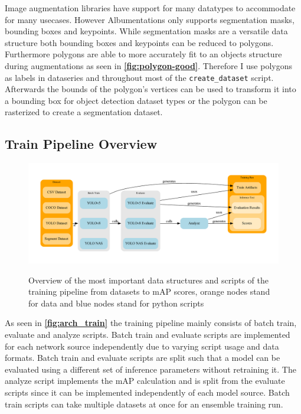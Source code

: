 \documentclass[10pt]{book}
\newcommand{\figureref}[1]{\textbf{\autoref{#1}}}
\begin{document}
Image augmentation libraries have support for many datatypes to accommodate for many usecases. However Albumentations only supports segmentation masks, bounding boxes and keypoints. While segmentation masks are a versatile data structure both bounding boxes and keypoints can be reduced to polygons. Furthermore polygons are able to more accurately fit to an objects structure during augmentations as seen in \figureref{fig:polygon-good}. Therefore I use polygons as labels in dataseries and throughout most of the \texttt{create\_dataset} script. Afterwards the bounds of the polygon's vertices can be used to transform it into a bounding box for object detection dataset types or the polygon can be rasterized to create a segmentation dataset.

\subsection{Train Pipeline Overview}

\begin{figure}
  \caption{Overview of the most important data structures and scripts of the training pipeline from datasets to \ac{mAP} scores, orange nodes stand for data and blue nodes stand for python scripts}
  \includegraphics[width=\textwidth]{graph/arch_train}
  \label{fig:arch_train}
\end{figure}

As seen in \figureref{fig:arch_train} the training pipeline mainly consists of batch train, evaluate and analyze scripts. Batch train and evaluate scripts are implemented for each network source independently due to varying script usage and data formats. Batch train and evaluate scripts are split such that a model can be evaluated using a different set of inference parameters without retraining it. The analyze script implements the \ac{mAP} calculation and is split from the evaluate scripts since it can be implemented independently of each model source. Batch train scripts can take multiple datasets at once for an ensemble training run.
\end{document}
